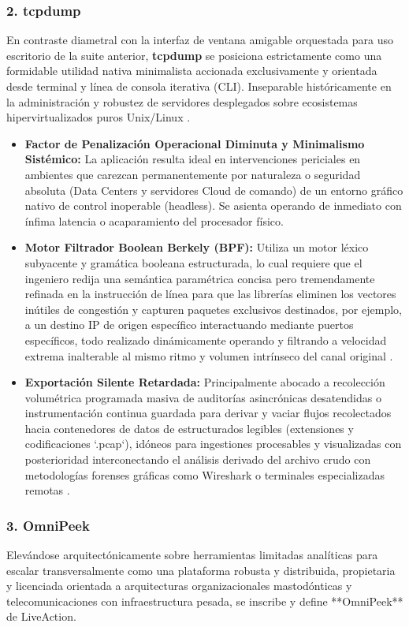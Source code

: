\documentclass[a4paper,12pt]{article}
\begin{document}
\subsubsection*{2. tcpdump}
En contraste diametral con la interfaz de ventana amigable orquestada para uso escritorio de la suite anterior, \textbf{tcpdump} se posiciona estrictamente como una formidable utilidad nativa minimalista accionada exclusivamente y orientada desde terminal y línea de consola iterativa (CLI). Inseparable históricamente en la administración y robustez de servidores desplegados sobre ecosistemas hipervirtualizados puros Unix/Linux \cite{tanenbaum2021}.

\begin{itemize}
    \item \textbf{Factor de Penalización Operacional Diminuta y Minimalismo Sistémico:} La aplicación resulta ideal en intervenciones periciales en ambientes que carezcan permanentemente por naturaleza o seguridad absoluta (Data Centers y servidores Cloud de comando) de un entorno gráfico nativo de control inoperable (headless). Se asienta operando de inmediato con ínfima latencia o acaparamiento del procesador físico.
    \item \textbf{Motor Filtrador Boolean Berkely (BPF):} Utiliza un motor léxico subyacente y gramática booleana estructurada, lo cual requiere que el ingeniero redija una semántica paramétrica concisa pero tremendamente refinada en la instrucción de línea para que las librerías eliminen los vectores inútiles de congestión y capturen paquetes exclusivos destinados, por ejemplo, a un destino IP de origen específico interactuando mediante puertos específicos, todo realizado dinámicamente operando y filtrando a velocidad extrema inalterable al mismo ritmo y volumen intrínseco del canal original \cite{kurose2017}.
    \item \textbf{Exportación Silente Retardada:} Principalmente abocado a recolección volumétrica programada masiva de auditorías asincrónicas desatendidas o instrumentación continua guardada para derivar y vaciar flujos recolectados hacia contenedores de datos de estructurados legibles (extensiones y codificaciones `.pcap`), idóneos para ingestiones procesables y visualizadas con posterioridad interconectando el análisis derivado del archivo crudo con metodologías forenses gráficas como Wireshark o terminales especializadas remotas \cite{stallings2014}.
\end{itemize}

\subsubsection*{3. OmniPeek}
Elevándose arquitectónicamente sobre herramientas limitadas analíticas para escalar transversalmente como una plataforma robusta y distribuida, propietaria y licenciada orientada a arquitecturas organizacionales mastodónticas y telecomunicaciones con infraestructura pesada, se inscribe y define **OmniPeek** de LiveAction.
\end{document}
